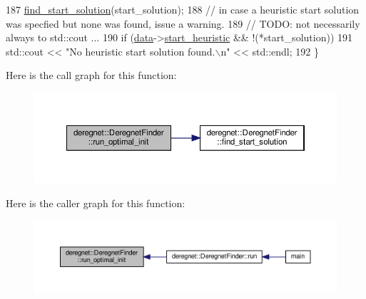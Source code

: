 \begin{DoxyCode}
187         \hyperlink{classderegnet_1_1DeregnetFinder_a9bca73c631c1ce679b07f1e0664abfa2}{find\_start\_solution}(start\_solution);
188     \textcolor{comment}{// in case a heuristic start solution was specfied but none was found, issue a warning.}
189     \textcolor{comment}{// TODO: not necessarily always to std::cout ...}
190     \textcolor{keywordflow}{if} (\hyperlink{classderegnet_1_1DeregnetFinder_ab158f2a6bb7f39ed3d6e4a9ffe568232}{data}->\hyperlink{classderegnet_1_1DeregnetData_abac721360704af5615f7ff84b183eebd}{start\_heuristic} && !(*start\_solution))
191         std::cout << \textcolor{stringliteral}{"No heuristic start solution found.\(\backslash\)n"} << std::endl;
192 \}
\end{DoxyCode}
Here is the call graph for this function\+:\nopagebreak
\begin{figure}[H]
\begin{center}
\leavevmode
\includegraphics[width=350pt]{classderegnet_1_1DeregnetFinder_ae0335349d6a60ee204d10bf8b7366cfa_cgraph}
\end{center}
\end{figure}
Here is the caller graph for this function\+:\nopagebreak
\begin{figure}[H]
\begin{center}
\leavevmode
\includegraphics[width=350pt]{classderegnet_1_1DeregnetFinder_ae0335349d6a60ee204d10bf8b7366cfa_icgraph}
\end{center}
\end{figure}
\mbox{\label{classderegnet_1_1DeregnetFinder_a92610c1444ba271820e64d224ec64bb7}} 
